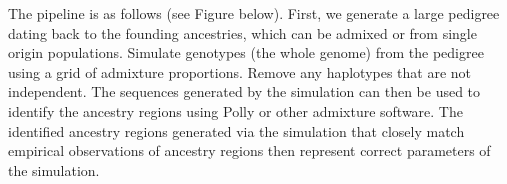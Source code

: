 \documentclass{article}
\begin{document}
The pipeline is as follows (see Figure below).  First, we generate a large pedigree dating back to the founding ancestries, which can be admixed or from single origin populations.  Simulate genotypes (the whole genome) from the pedigree using a grid of admixture proportions.  Remove any haplotypes that are not independent.  The sequences generated by the simulation can then be used to identify the ancestry regions using Polly or other admixture software.  The identified ancestry regions generated via the simulation that closely match empirical observations of ancestry regions then represent correct parameters of the simulation. 




\end{document}

